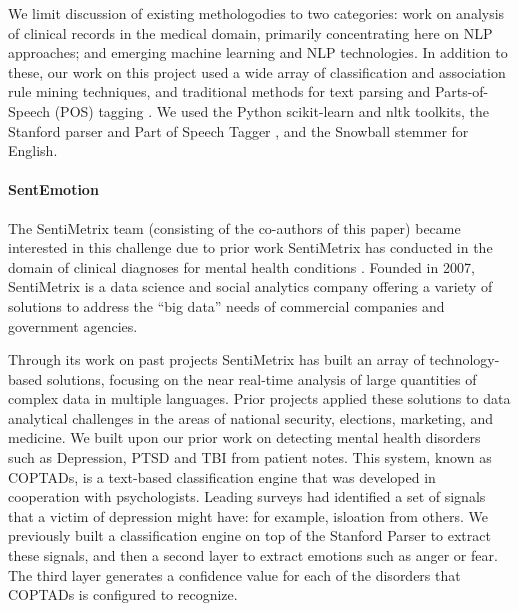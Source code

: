 We limit discussion of existing methologodies to two categories:
work on analysis of clinical records in the medical domain, primarily concentrating
here on NLP approaches; and emerging machine learning and NLP technologies.
In addition to these, our work on this project used a wide array of 
classification \cite{wu08} and association rule mining \cite{fpgrowth} techniques, and
traditional methods for text parsing and Parts-of-Speech (POS) tagging \cite{stanfordparser}. 
We used the Python \textsf{scikit-learn} \cite{scikit-learn} 
and \textsf{nltk} \cite{nltk} toolkits, the Stanford parser and Part of Speech Tagger \cite{stanfordparser}, and 
the Snowball stemmer for English\cite{snowball}. 

\paragraph{SentEmotion} 
The SentiMetrix team (consisting of the co-authors of this paper) became interested
in this challenge due to prior work SentiMetrix has conducted in the
domain of clinical diagnoses for mental health conditions \cite{coptads,coptads-book}.
Founded in 2007, SentiMetrix is a data science and social analytics company
offering a variety of solutions to address the “big data” needs of commercial companies and government agencies. 

Through its work on past projects \cite{dickerson14,kagan15,darpa} SentiMetrix has built an array of technology-based solutions, focusing on the near real-time analysis of large quantities of complex data in multiple languages. Prior projects
applied these solutions to data analytical challenges in the areas of national security, elections, marketing, and medicine.
We built upon our prior work on detecting mental health disorders such as Depression, PTSD and TBI from patient notes\cite{coptads,coptads-book}. This system, known as COPTADs, is a text-based classification engine that was developed in cooperation with psychologists. Leading surveys had identified a set of signals that a victim of depression might have: for example, isloation from others. We previously built a classification engine on top of the Stanford Parser \cite{stanfordparser} to extract these signals, 
and then a second layer to extract emotions such as anger or fear. The third layer generates a confidence value for each of the disorders that COPTADs is configured to recognize.

